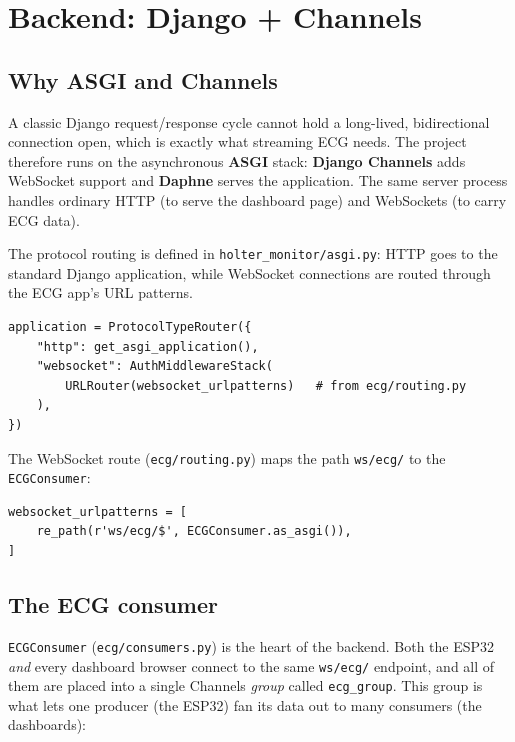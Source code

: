 \section{Backend: Django + Channels}

\subsection{Why ASGI and Channels}
A classic Django request/response cycle cannot hold a long-lived, bidirectional
connection open, which is exactly what streaming ECG needs. The project therefore
runs on the asynchronous \textbf{ASGI} stack: \textbf{Django Channels} adds
WebSocket support and \textbf{Daphne} serves the application. The same server
process handles ordinary HTTP (to serve the dashboard page) and WebSockets (to
carry ECG data).

The protocol routing is defined in \texttt{holter\_monitor/asgi.py}: HTTP goes to
the standard Django application, while WebSocket connections are routed through
the ECG app's URL patterns.

\begin{lstlisting}[style=py,caption={ASGI routing -- HTTP and WebSocket on one server.}]
application = ProtocolTypeRouter({
    "http": get_asgi_application(),
    "websocket": AuthMiddlewareStack(
        URLRouter(websocket_urlpatterns)   # from ecg/routing.py
    ),
})
\end{lstlisting}

The WebSocket route (\texttt{ecg/routing.py}) maps the path \texttt{ws/ecg/} to the
\texttt{ECGConsumer}:
\begin{lstlisting}[style=py,numbers=none]
websocket_urlpatterns = [
    re_path(r'ws/ecg/$', ECGConsumer.as_asgi()),
]
\end{lstlisting}

\subsection{The ECG consumer}
\texttt{ECGConsumer} (\texttt{ecg/consumers.py}) is the heart of the backend. Both
the ESP32 \emph{and} every dashboard browser connect to the same
\texttt{ws/ecg/} endpoint, and all of them are placed into a single Channels
\emph{group} called \texttt{ecg\_group}. This group is what lets one producer (the
ESP32) fan its data out to many consumers (the dashboards):

